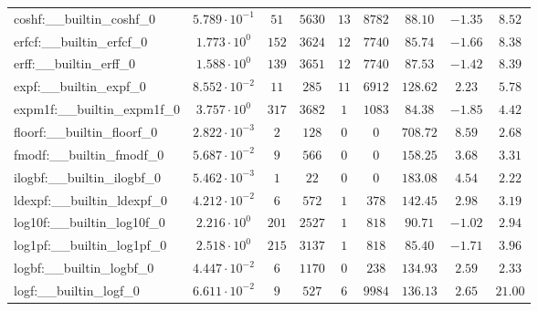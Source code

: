 \begin{tabular}{|l|c|c|c|c|c|c|c|c|}
coshf:\_\_builtin\_coshf\_0               & $ 5.789 \cdot 10^{-1} $ & $ 51     $ & $ 5630  $ & $ 13  $ & $ 8782   $ & $ 88.10       $ & $ -1.35   $ & $ 8.52    $ \\
erfcf:\_\_builtin\_erfcf\_0               & $ 1.773 \cdot 10^{0}  $ & $ 152    $ & $ 3624  $ & $ 12  $ & $ 7740   $ & $ 85.74       $ & $ -1.66   $ & $ 8.38    $ \\
erff:\_\_builtin\_erff\_0                 & $ 1.588 \cdot 10^{0}  $ & $ 139    $ & $ 3651  $ & $ 12  $ & $ 7740   $ & $ 87.53       $ & $ -1.42   $ & $ 8.39    $ \\
expf:\_\_builtin\_expf\_0                 & $ 8.552 \cdot 10^{-2} $ & $ 11     $ & $ 285   $ & $ 11  $ & $ 6912   $ & $ 128.62      $ & $ 2.23    $ & $ 5.78    $ \\
expm1f:\_\_builtin\_expm1f\_0             & $ 3.757 \cdot 10^{0}  $ & $ 317    $ & $ 3682  $ & $ 1   $ & $ 1083   $ & $ 84.38       $ & $ -1.85   $ & $ 4.42    $ \\
floorf:\_\_builtin\_floorf\_0             & $ 2.822 \cdot 10^{-3} $ & $ 2      $ & $ 128   $ & $ 0   $ & $ 0      $ & $ 708.72      $ & $ 8.59    $ & $ 2.68    $ \\
fmodf:\_\_builtin\_fmodf\_0               & $ 5.687 \cdot 10^{-2} $ & $ 9      $ & $ 566   $ & $ 0   $ & $ 0      $ & $ 158.25      $ & $ 3.68    $ & $ 3.31    $ \\
ilogbf:\_\_builtin\_ilogbf\_0             & $ 5.462 \cdot 10^{-3} $ & $ 1      $ & $ 22    $ & $ 0   $ & $ 0      $ & $ 183.08      $ & $ 4.54    $ & $ 2.22    $ \\
ldexpf:\_\_builtin\_ldexpf\_0             & $ 4.212 \cdot 10^{-2} $ & $ 6      $ & $ 572   $ & $ 1   $ & $ 378    $ & $ 142.45      $ & $ 2.98    $ & $ 3.19    $ \\
log10f:\_\_builtin\_log10f\_0             & $ 2.216 \cdot 10^{0}  $ & $ 201    $ & $ 2527  $ & $ 1   $ & $ 818    $ & $ 90.71       $ & $ -1.02   $ & $ 2.94    $ \\
log1pf:\_\_builtin\_log1pf\_0             & $ 2.518 \cdot 10^{0}  $ & $ 215    $ & $ 3137  $ & $ 1   $ & $ 818    $ & $ 85.40       $ & $ -1.71   $ & $ 3.96    $ \\
logbf:\_\_builtin\_logbf\_0               & $ 4.447 \cdot 10^{-2} $ & $ 6      $ & $ 1170  $ & $ 0   $ & $ 238    $ & $ 134.93      $ & $ 2.59    $ & $ 2.33    $ \\
logf:\_\_builtin\_logf\_0                 & $ 6.611 \cdot 10^{-2} $ & $ 9      $ & $ 527   $ & $ 6   $ & $ 9984   $ & $ 136.13      $ & $ 2.65    $ & $ 21.00   $ \\

\end{tabular}
